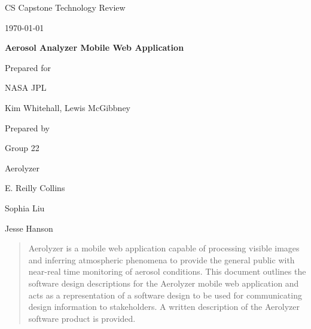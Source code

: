 \documentclass[onecolumn, draftclsnofoot,10pt, compsoc]{IEEEtran}
\def \CapstoneTeamName{		Aerolyzer}
\def \CapstoneTeamNumber{		22}
\def \GroupMemberOne{			E. Reilly Collins}
\def \GroupMemberTwo{			Sophia Liu}
\def \GroupMemberThree{			Jesse Hanson}
\def \CapstoneProjectName{		Aerosol Analyzer Mobile Web Application}
\def \CapstoneSponsorCompany{	NASA JPL}
\def \CapstoneSponsorPerson{		Kim Whitehall, Lewis McGibbney}
\def \DocType{		%
				Technology Review
				}
\newcommand{\NameSigPair}[1]{\par
\makebox[2.75in][r]{#1} \hfil 	\makebox[3.25in]{\makebox[2.25in]{\hrulefill} \hfill		\makebox[.75in]{\hrulefill}}
\par\vspace{-12pt} \textit{\tiny\noindent
\makebox[2.75in]{} \hfil		\makebox[3.25in]{\makebox[2.25in][r]{Signature} \hfill	\makebox[.75in][r]{Date}}}}
\renewcommand{\NameSigPair}[1]{#1}
\begin{document}
\begin{titlepage}
    \begin{singlespace}
        \hfill 
        \par\vspace{.2in}
        \centering
        \scshape{
            \huge CS Capstone \DocType \par
            {\large\today}\par
            \vspace{.5in}
            \textbf{\Huge\CapstoneProjectName}\par
            \vfill
            {\large Prepared for}\par
            \Huge \CapstoneSponsorCompany\par
            \vspace{5pt}
            {\Large\NameSigPair{\CapstoneSponsorPerson}\par}
            {\large Prepared by }\par
            Group\CapstoneTeamNumber\par
            \CapstoneTeamName\par 
            \vspace{5pt}
            {\Large
                \NameSigPair{\GroupMemberOne}\par
                \NameSigPair{\GroupMemberTwo}\par
                \NameSigPair{\GroupMemberThree}\par
            }
            \vspace{20pt}
        }
        \begin{abstract}
        	Aerolyzer is a mobile web application capable of processing visible images and inferring atmospheric phenomena to provide the general public with near-real time monitoring of aerosol conditions. 
            This document outlines the software design descriptions for the Aerolyzer mobile web application and acts as a representation of a software design to be used for communicating design information to stakeholders. 
            A written description of the Aerolyzer software product is provided. 
        \end{abstract}     
    \end{singlespace}
\end{titlepage}
\end{document}
